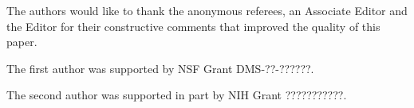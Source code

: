 \documentclass[aap]{imsart}
\theoremstyle{plain}
\theoremstyle{definition}
\begin{document}
\begin{acks}[Acknowledgments]
The authors would like to thank the anonymous referees, an Associate
Editor and the Editor for their constructive comments that improved the
quality of this paper.
\end{acks}

\begin{funding}
The first author was supported by NSF Grant DMS-??-??????.

The second author was supported in part by NIH Grant ???????????.
\end{funding}

\begin{supplement}
\end{supplement}
\begin{supplement}
\end{supplement}

\end{document}
